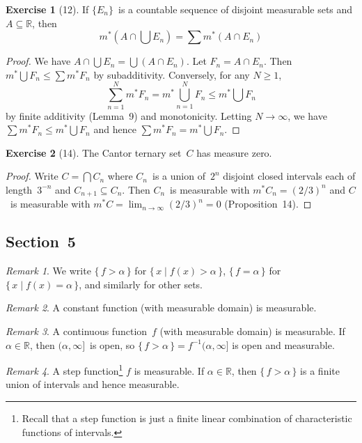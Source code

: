 \documentclass[letterpaper,12pt]{article}
\newcommand{\R}{\mathbb{R}}
\newcommand{\sect}{\cap}
\newcommand{\bigunion}{\bigcup}
\newcommand{\bigsect}{\bigcap}
\newcommand{\mo}{m^*}
\theoremstyle{plain}
\theoremstyle{definition}
\newtheorem*{exer}{Exercise}
\theoremstyle{remark}
\newtheorem*{rmk}{Remark}
\begin{document}
\begin{exer}[12]
If \(\{E_n\}\)~is a countable sequence of disjoint measurable sets and \(A\subseteq\R\), then
\[\mo\left(A\sect\bigunion E_n\right)=\sum\mo(A\sect E_n)\]
\end{exer}
\begin{proof}
We have \(A\sect\bigunion E_n=\bigunion(A\sect E_n)\). Let \(F_n=A\sect E_n\). Then \(\mo\bigunion F_n\le\sum\mo F_n\) by subadditivity. Conversely, for any \(N\ge 1\),
\[\sum_{n=1}^N\mo F_n=\mo\bigunion_{n=1}^N F_n\le\mo\bigunion F_n\]
by finite additivity (Lemma~9) and monotonicity. Letting \(N\to\infty\), we have \(\sum\mo F_n\le\mo\bigunion F_n\) and hence \(\sum\mo F_n=\mo\bigunion F_n\).
\end{proof}

\begin{exer}[14]
The Cantor ternary set~\(C\) has measure zero.
\end{exer}
\begin{proof}
Write \(C=\bigsect C_n\) where \(C_n\)~is a union of~\(2^n\) disjoint closed intervals each of length~\(3^{-n}\) and \(C_{n+1}\subseteq C_n\). Then \(C_n\)~is measurable with \(\mo C_n=(2/3)^n\) and \(C\)~is measurable with \(\mo C=\lim_{n\to\infty}(2/3)^n=0\) (Proposition~14).
\end{proof}

\subsection*{Section~5}
\begin{rmk}
We write \(\{\,f>\alpha\,\}\) for \(\{\,x\mid f(x)>\alpha\,\}\), \(\{\,f=\alpha\,\}\) for \(\{\,x\mid f(x)=\alpha\,\}\), and similarly for other sets.
\end{rmk}

\begin{rmk}
A constant function (with measurable domain) is measurable.
\end{rmk}

\begin{rmk}
A continuous function~\(f\) (with measurable domain) is measurable. If \(\alpha\in\R\), then \((\alpha,\infty]\)~is open, so \(\{\,f>\alpha\,\}=f^{-1}(\alpha,\infty]\) is open and measurable.
\end{rmk}

\begin{rmk}
A step function\footnote{Recall that a step function is just a finite linear combination of characteristic functions of intervals.} \(f\) is measurable. If \(\alpha\in\R\), then \(\{\,f>\alpha\,\}\) is a finite union of intervals and hence measurable.
\end{rmk}
\end{document}

